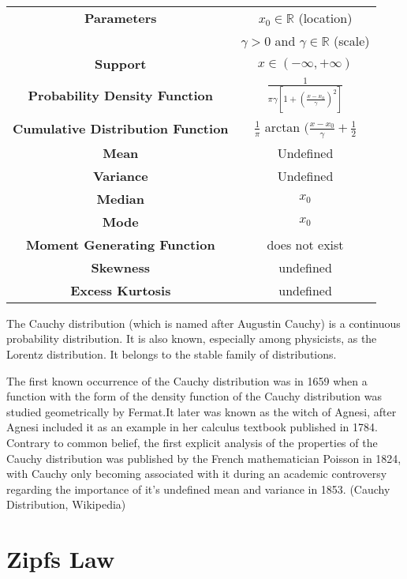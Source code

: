 \documentclass[14pt, a4paper]{article}
\theoremstyle{definition}
\newcommand{\R}{\mathbb{R}}
\begin{document}
\begin{center}
    \begin{tabular}{|c|c|}  %
\hline
 \textbf{Parameters }& $x_0 \in \R$ (location) \\ & $\gamma > 0 $ and $\gamma \in \R$ (scale) \\
 \hline
 \textbf{Support} & $x \in (- \infty , + \infty)$ \\
 \hline
 \textbf{Probability Density Function} &  $\frac{1}{\pi \gamma [1 + (\frac{x-x_0}{\gamma})^2 ]}$\\
 \hline
 \textbf{Cumulative Distribution Function} &  $\frac{1}{\pi}$ arctan $\Big( \frac{x - x_0}{\gamma} + \frac{1}{2}$\\
 \hline
 \textbf{Mean} & Undefined \\ 
 \hline
 \textbf{Variance} & Undefined \\
 \hline
 \textbf{Median} & $x_0$ \\ 
 \hline
 \textbf{Mode} & $x_0$ \\
 \hline
 \textbf{Moment Generating Function} & does not exist\\
 \hline
 \textbf{Skewness} & undefined\\
 \hline
 \textbf{Excess Kurtosis} & undefined \\
 \hline
       
  \end{tabular}
\end{center}


  
The Cauchy distribution (which is named after Augustin Cauchy) is a continuous probability distribution. It is also known, especially among physicists, as the Lorentz distribution. It belongs to the stable family of distributions.

The first known occurrence of the Cauchy distribution was in 1659 when a function with the form of the density function of the Cauchy distribution was studied geometrically by Fermat.It later was known as the witch of Agnesi, after Agnesi included it as an example in her calculus textbook published in 1784. Contrary to common belief, the first explicit analysis of the properties of the Cauchy distribution was published by the French mathematician Poisson in 1824, with Cauchy only becoming associated with it during an academic controversy regarding the importance of it's undefined mean and variance in 1853. (Cauchy Distribution, Wikipedia)
  
  
\section{Zipfs Law}
\end{document}
